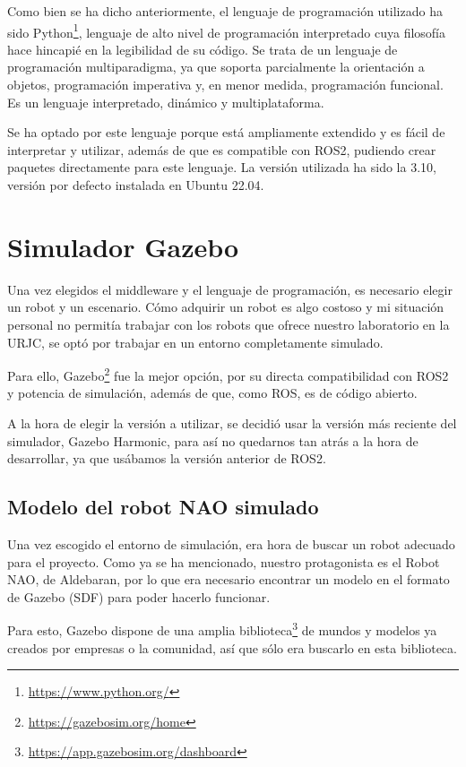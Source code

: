 Como bien se ha dicho anteriormente, el lenguaje de programación utilizado ha sido Python\footnote{\url{https://www.python.org/}}, lenguaje de alto nivel de programación interpretado cuya filosofía hace hincapié en la legibilidad de su código. Se trata de un lenguaje de programación multiparadigma, ya que soporta parcialmente la orientación a objetos, programación imperativa y, en menor medida, programación funcional. Es un lenguaje interpretado, dinámico y multiplataforma.

Se ha optado por este lenguaje porque está ampliamente extendido y es fácil de interpretar y utilizar, además de que es compatible con ROS2, pudiendo crear paquetes directamente para este lenguaje. La versión utilizada ha sido la 3.10, versión por defecto instalada en Ubuntu 22.04.

\section{Simulador Gazebo}

Una vez elegidos el middleware y el lenguaje de programación, es necesario elegir un robot y un escenario. Cómo adquirir un robot es algo costoso y mi situación personal no permitía trabajar con los robots que ofrece nuestro laboratorio en la URJC, se optó por trabajar en un entorno completamente simulado.

Para ello, Gazebo\footnote{\url{https://gazebosim.org/home}} fue la mejor opción, por su directa compatibilidad con ROS2 y potencia de simulación, además de que, como ROS, es de código abierto.

A la hora de elegir la versión a utilizar, se decidió usar la versión más reciente del simulador, Gazebo Harmonic, para así no quedarnos tan atrás a la hora de desarrollar, ya que usábamos la versión anterior de ROS2.

\subsection{Modelo del robot NAO simulado}

Una vez escogido el entorno de simulación, era hora de buscar un robot adecuado para el proyecto. Como ya se ha mencionado, nuestro protagonista es el Robot NAO, de Aldebaran, por lo que era necesario encontrar un modelo en el formato de Gazebo (SDF) para poder hacerlo funcionar.

Para esto, Gazebo dispone de una amplia biblioteca\footnote{\url{https://app.gazebosim.org/dashboard}} de mundos y modelos ya creados por empresas o la comunidad, así que sólo era buscarlo en esta biblioteca.

